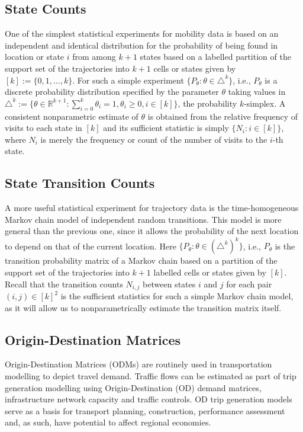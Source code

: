 \documentclass[times,twocolumn,final,authoryear]{elsarticle}
\begin{document}
\subsection{State Counts}
One of the simplest statistical experiments for mobility data is based on an independent and identical distribution for the probability of being found in location or state $i$ from among $k+1$ states based on a labelled partition of the support set of the trajectories into $k+1$ cells or states given by $[k] := \{0,1,\ldots,k\}$.  
For such a simple experiment $\{P_{\theta}: \theta \in \triangle^k \}$, i.e., $P_{\theta}$ is a discrete probability distribution specified by the 
parameter $\theta$ taking values in 
$\triangle^k := \{ \theta \in \mathbb{R}^{k+1} : \sum_{i=0}^k \theta_i = 1, \theta_i \geq 0, i \in [k] \}$, 
the probability $k$-simplex. 
A consistent nonparametric estimate of $\theta$ is obtained from the relative frequency of visits to each state in $[k]$ and its sufficient statistic is simply $\{N_i: i \in [k]\}$, where $N_i$ is merely the frequency or count of the number of visits to the $i$-th state.  

\subsection{State Transition Counts}
A more useful statistical experiment for trajectory data is the time-homogeneous Markov chain model of independent random transitions. This model is more general than the previous one, since it allows the probability of the next location to depend on that of the current location.   
Here $\{P_{\theta}: \theta \in (\triangle^k)^k\}$, i.e., $P_{\theta}$ is the transition probability matrix of a Markov chain based on a partition of the support set of the trajectories into $k+1$ labelled cells or states given by $[k]$.  
Recall that the transition counts $N_{i,j}$ between states $i$ and $j$ for each pair $(i,j) \in [k]^2$ is the sufficient statistics for such a simple Markov chain model, as it will allow us to nonparametrically estimate the transition matrix itself.  

\subsection{Origin-Destination Matrices}
Origin-Destination Matrices (ODMs) are routinely used in transportation modelling to depict travel demand.  
Traffic flows can be estimated as part of trip generation modelling using Origin-Destination (OD) demand matrices, infrastructure network capacity and traffic controls. 
OD trip generation models serve as a basis for transport planning, construction, performance assessment and, as such, have potential to affect regional economies. 
\end{document}
